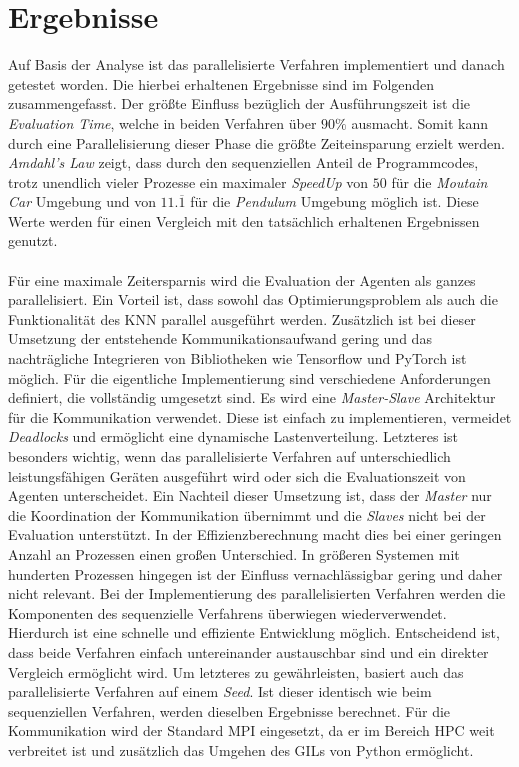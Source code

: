 \section{Ergebnisse}
\label{sec:results_optimziation}
Auf Basis der Analyse ist das parallelisierte Verfahren implementiert und danach getestet worden. Die hierbei erhaltenen Ergebnisse sind im Folgenden zusammengefasst. Der größte Einfluss bezüglich der Ausführungszeit ist die \emph{Evaluation Time}, welche in beiden Verfahren über $90\%$ ausmacht. Somit kann durch eine Parallelisierung dieser Phase die größte Zeiteinsparung erzielt werden. \emph{Amdahl's Law} zeigt, dass durch den sequenziellen Anteil de Programmcodes, trotz unendlich vieler Prozesse ein maximaler \emph{SpeedUp} von $50$ für die \emph{Moutain Car} Umgebung und von $11.\overline{1}$ für die \emph{Pendulum} Umgebung möglich ist. Diese Werte werden für einen Vergleich mit den tatsächlich erhaltenen Ergebnissen genutzt.
\\\\
Für eine maximale Zeitersparnis wird die Evaluation der Agenten als ganzes parallelisiert. Ein Vorteil ist, dass sowohl das Optimierungsproblem als auch die Funktionalität des \ac{KNN} parallel ausgeführt werden. Zusätzlich ist bei dieser Umsetzung der entstehende Kommunikationsaufwand gering und das nachträgliche Integrieren von Bibliotheken wie Tensorflow und PyTorch ist möglich. Für die eigentliche Implementierung sind verschiedene Anforderungen definiert, die vollständig umgesetzt sind. Es wird eine \emph{Master-Slave} Architektur für die Kommunikation verwendet. Diese ist einfach zu implementieren, vermeidet \emph{Deadlocks} und ermöglicht eine dynamische Lastenverteilung. Letzteres ist besonders wichtig, wenn das parallelisierte Verfahren auf unterschiedlich leistungsfähigen Geräten ausgeführt wird oder sich die Evaluationszeit von Agenten unterscheidet. Ein Nachteil dieser Umsetzung ist, dass der \emph{Master} nur die Koordination der Kommunikation übernimmt und die \emph{Slaves} nicht bei der Evaluation unterstützt. In der Effizienzberechnung macht dies bei einer geringen Anzahl an Prozessen einen großen Unterschied. In größeren Systemen mit hunderten Prozessen hingegen ist der Einfluss vernachlässigbar gering und daher nicht relevant. Bei der Implementierung des parallelisierten Verfahren werden die Komponenten des sequenzielle Verfahrens überwiegen wiederverwendet. Hierdurch ist eine schnelle und effiziente Entwicklung möglich. Entscheidend ist, dass beide Verfahren einfach untereinander austauschbar sind und ein direkter Vergleich ermöglicht wird. Um letzteres zu gewährleisten, basiert auch das parallelisierte Verfahren auf einem \emph{Seed}. Ist dieser identisch wie beim sequenziellen Verfahren, werden dieselben Ergebnisse berechnet. Für die Kommunikation wird der Standard \ac{MPI} eingesetzt, da er im Bereich \ac{HPC} weit verbreitet ist und zusätzlich das Umgehen des \acp{GIL} von Python ermöglicht.
